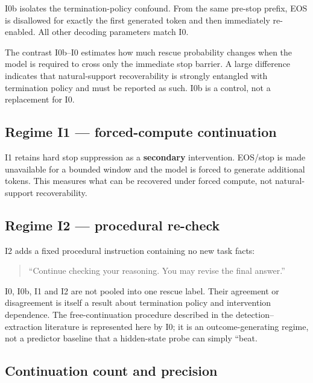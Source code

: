 I0b isolates the termination-policy confound. From the same pre-stop prefix, EOS is disallowed for exactly the first generated token and then immediately re-enabled. All other decoding parameters match I0.

The contrast I0b--I0 estimates how much rescue probability changes when the model is required to cross only the immediate stop barrier. A large difference indicates that natural-support recoverability is strongly entangled with termination policy and must be reported as such. I0b is a control, not a replacement for I0.

\subsection{Regime I1 --- forced-compute continuation}\label{counterfactual-i1---hard-stop-suppression}

I1 retains hard stop suppression as a \textbf{secondary} intervention. EOS/stop is made unavailable for a bounded window and the model is forced to generate additional tokens. This measures what can be recovered under forced compute, not natural-support recoverability.

\subsection{Regime I2 --- procedural re-check}\label{counterfactual-i2---procedural-continuation-robustness-arm}

I2 adds a fixed procedural instruction containing no new task facts:

\begin{quote}
``Continue checking your reasoning. You may revise the final answer.''
\end{quote}

I0, I0b, I1 and I2 are not pooled into one rescue label. Their agreement or disagreement is itself a result about termination policy and intervention dependence. The free-continuation procedure described in the detection--extraction literature is represented here by I0; it is an outcome-generating regime, not a predictor baseline that a hidden-state probe can simply ``beat.

\subsection{Continuation count and precision}\label{continuation-count-and-precision}

